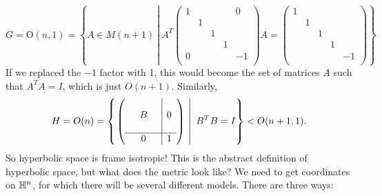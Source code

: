 \[
G=\mathrm O(n,1)=\left\{ A \in M(n+1)\ \left| \
A^T
\begin{pmatrix}
    1 & & &  &0\\
     &1 & &  &\\
     & & 1&  &\\
     & & &1  &\\
     0& & &  &-1 \\
\end{pmatrix}A=
\begin{pmatrix}
    1 & & &  &\\
     &1 & &  &\\
     & & 1&  &\\
     & & &1  &\\
     & & & & -1 \\
\end{pmatrix}
\right. 
 \right\} \] If we replaced the $-1$ factor with 1, this would become the set of matrices $A$ such that $A^TA=I$, which is just $O(n+1)$. Similarly, \[
 H=O(n)=
 \left\{ \left.     \mleft(\begin{array}{ccc|c}
                    & & &  \\
                    & B & &0 \\
                    & & &  \\
                    \hline
                    & 0 & &  1
     \end{array}\mright) \ \right| \ B^TB=I \right\} < O(n+1,1).
 \] So hyperbolic space is frame isotropic! This is the abstract definition of hyperbolic space, but what does the metric look like? We need to get coordinates on $\mathbb{H}^n $, for which there will be several different models. There are three ways:
